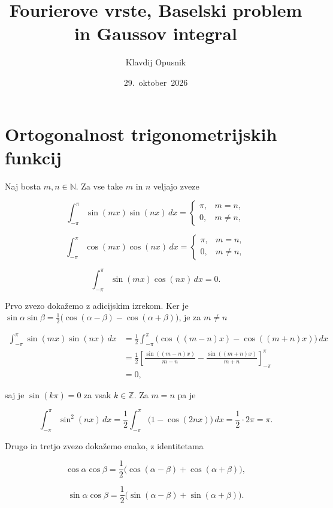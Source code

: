 \documentclass[a4paper]{article}
\title{Fourierove vrste, Baselski problem in Gaussov integral}
\author{Klavdij Opusnik}
\date{29.~oktober~2026}
\begin{document}
\maketitle

\section{Ortogonalnost trigonometrijskih
funkcij}\label{ortogonalnost-trigonometrijskih-funkcij}

Naj bosta \(m, n \in \mathbb{N}\). Za vse take \(m\) in \(n\) veljajo
zveze

\[\int_{-\pi}^{\pi} \sin(mx) \sin(nx) \, dx = \begin{cases} \pi, & m = n, \\ 0, & m \neq n, \end{cases}\]

\[\int_{-\pi}^{\pi} \cos(mx) \cos(nx) \, dx = \begin{cases} \pi, & m = n, \\ 0, & m \neq n, \end{cases}\]

\[\int_{-\pi}^{\pi} \sin(mx) \cos(nx) \, dx = 0.\]

Prvo zvezo dokažemo z adicijskim izrekom. Ker je
\(\sin \alpha \sin \beta = \frac{1}{2} \bigl( \cos(\alpha - \beta) - \cos(\alpha + \beta) \bigr)\),
je za \(m \neq n\)

\[\begin{aligned}
\int_{-\pi}^{\pi} \sin(mx) \sin(nx) \, dx
&= \frac{1}{2} \int_{-\pi}^{\pi} \bigl( \cos((m - n)x) - \cos((m + n)x) \bigr) \, dx \\
&= \frac{1}{2} \left[ \frac{\sin((m - n)x)}{m - n} - \frac{\sin((m + n)x)}{m + n} \right]_{-\pi}^{\pi} \\
&= 0,
\end{aligned}\]

saj je \(\sin(k\pi) = 0\) za vsak \(k \in \mathbb{Z}\). Za \(m = n\) pa
je

\[\int_{-\pi}^{\pi} \sin^2(nx) \, dx = \frac{1}{2} \int_{-\pi}^{\pi} \bigl( 1 - \cos(2nx) \bigr) \, dx = \frac{1}{2} \cdot 2\pi = \pi.\]

Drugo in tretjo zvezo dokažemo enako, z identitetama

\[\cos \alpha \cos \beta = \frac{1}{2} \bigl( \cos(\alpha - \beta) + \cos(\alpha + \beta) \bigr),\]

\[\sin \alpha \cos \beta = \frac{1}{2} \bigl( \sin(\alpha - \beta) + \sin(\alpha + \beta) \bigr).\]
\end{document}
